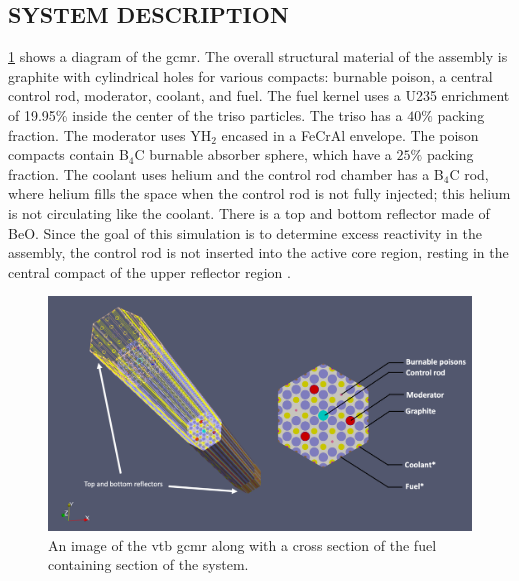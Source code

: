 \documentclass[letterpaper]{physor2024}
\begin{document}
\subsection{SYSTEM DESCRIPTION}\label{sec:system}
 \cref{fig:vtb_gcmr} shows a diagram of the \gls{gcmr}. The overall structural material of the assembly is graphite with cylindrical holes for various compacts: burnable poison, a central control rod, moderator, coolant, and fuel. The fuel kernel uses a U235 enrichment of 19.95\% inside the center of the \gls{triso} particles. The \gls{triso} has a $40\%$ packing fraction. The moderator uses YH$_{2}$ encased in a FeCrAl envelope. The poison compacts contain B$_{4}$C burnable absorber sphere, which have a $25\%$ packing fraction. The coolant uses helium and the control rod chamber has a B$_{4}$C rod, where helium fills the space when the control rod is not fully injected; this helium is not circulating like the coolant. There is a top and bottom reflector made of BeO. Since the goal of this simulation is to determine excess reactivity in the assembly, the control rod is not inserted into the active core region, resting in the central compact of the upper reflector region \cite{Abdelhameed-ANS-2022}.
\begin{figure}[h!]
    \centering
    \includegraphics[width=0.725\linewidth]{figures/vtb_gcmr_diagram.jpg}
    \caption{An image of the \gls{vtb} \gls{gcmr} along with a cross section of the fuel containing section of the system.}
    \label{fig:vtb_gcmr}
\end{figure}
\end{document}
